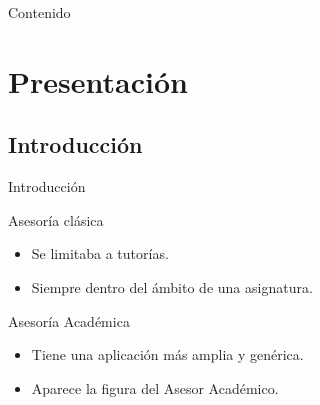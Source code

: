\documentclass[10pt, hyperref={pdfpagelabels=false}]{beamer}
\begin{document}


   \begin{frame}{Contenido}
    \tableofcontents[hideallsubsections]
   \end{frame}

  \section{Presentación}
    \subsection{Introducción}
      \begin{frame}{Introducción}
        \begin{block}{Asesoría clásica}
          \begin{itemize}
          \item Se limitaba a tutorías.
          \item Siempre dentro del ámbito de una asignatura.
          \end{itemize}
        \end{block}
        \begin{block}{Asesoría Académica}
          \begin{itemize}
          \item Tiene una aplicación más amplia y genérica.
          \item Aparece la figura del Asesor Académico.
          \end{itemize}
        \end{block}
      \end{frame}
\end{document}
